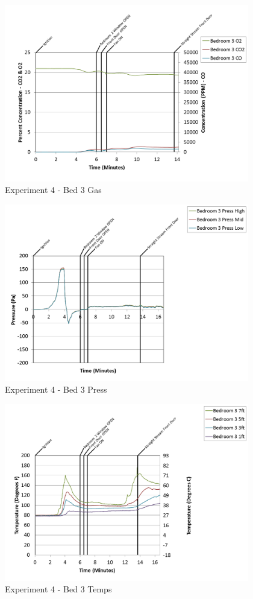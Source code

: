 \documentclass{article}
\begin{document}
\begin{appendices}
\clearpage

\begin{figure}[h!]
	\centering
	\includegraphics[height=3.05in]{0_Images/Results_Charts/Exp_4_Charts/Bed3Gas.png}
	\caption{Experiment 4 - Bed 3 Gas}
\end{figure}


\begin{figure}[h!]
	\centering
	\includegraphics[height=3.05in]{0_Images/Results_Charts/Exp_4_Charts/Bed3Press.png}
	\caption{Experiment 4 - Bed 3 Press}
\end{figure}

\clearpage

\begin{figure}[h!]
	\centering
	\includegraphics[height=3.05in]{0_Images/Results_Charts/Exp_4_Charts/Bed3Temps.png}
	\caption{Experiment 4 - Bed 3 Temps}
\end{figure}



\end{appendices}
\end{document}

